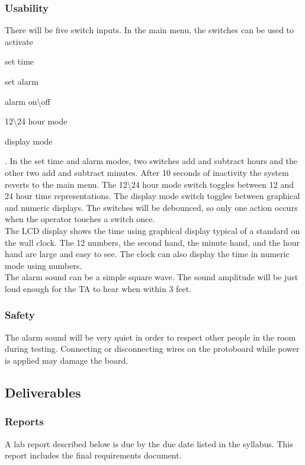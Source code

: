 \documentclass{article}
\begin{document}
		\subsubsection{Usability}
			There will be five switch inputs. In the main menu, the switches can be used to activate
			\begin{inlinelist}
				\item set time
				\item set alarm
				\item alarm on\textbackslash off
				\item 12\textbackslash 24 hour mode
				\item display mode
			\end{inlinelist}.
			In the set time and alarm modes, two switches add and subtract hours and the other two add and subtract minutes. After 10 seconds of inactivity the system reverts to the main menu. The 12\textbackslash 24 hour mode switch toggles between 12 and 24 hour time representations. The display mode switch toggles between graphical and numeric displays. The switches will be debounced, so only one action occurs when the operator touches a switch once.\\
			The LCD display shows the time using graphical display typical of a standard on the wall clock. The 12 numbers, the second hand, the minute hand, and the hour hand are large and easy to see. The clock can also display the time in numeric mode using numbers.\\
			The alarm sound can be a simple square wave. The sound amplitude will be just loud enough for the TA to hear when within 3 feet.
		
		\subsubsection{Safety}
			The alarm sound will be very quiet in order to respect other people in the room during testing. Connecting or disconnecting wires on the protoboard while power is applied may damage the board.

	\subsection{Deliverables}

		\subsubsection{Reports}
			A lab report described below is due by the due date listed in the syllabus. This report includes the final requirements document.
	
\end{document}
